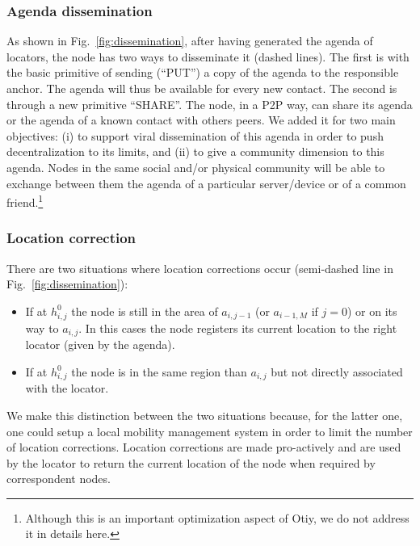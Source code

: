 \documentclass[a4paper]{sig-alternate-10pt}
\newcommand{\otiy}{{\sffamily Otiy}}
\begin{document}
\subsubsection{Agenda dissemination}

As shown in Fig.~\ref{fig:dissemination}, after having generated the
agenda of locators, the node has two ways to disseminate it (dashed
lines). The first is with the basic primitive of sending (``PUT'') a
copy of the agenda to the responsible anchor. The agenda will thus
be available for every new contact. The second is through a new
primitive ``SHARE''. The node, in a \textsc{P2P} way, can share its
agenda or the agenda of a known contact with others peers. We added
it for two main objectives: (i) to support viral dissemination of
this agenda in order to push decentralization to its limits, and
(ii) to give a community dimension to this agenda. Nodes in the same
social and/or physical community will be able to exchange between
them the agenda of a particular server/device or of a common
friend.\footnote{Although this is an important optimization aspect
of \otiy, we do not address it in details here.}


\subsubsection{Location correction}

There are two situations where location corrections occur
(semi-dashed line in Fig.~\ref{fig:dissemination}):

\begin{itemize}

\item If at $h_{i,j}^0$ the node is still in the area of $a_{i,j-1}$
(or $a_{i-1,M}$ if $j=0$) or on its way to $a_{i,j}$. In this 
cases the node registers its current location to the right locator 
(given by the agenda).

\item If at $h_{i,j}^0$ the node is in the same region than $a_{i,j}$
but not directly associated with the locator.

\end{itemize}

We make this distinction between the two situations because, for the
latter one, one could setup a local mobility management system in
order to limit the number of location corrections. Location
corrections are made pro-actively and are used by the locator to
return the current location of the node when required by
correspondent nodes.
\end{document}

